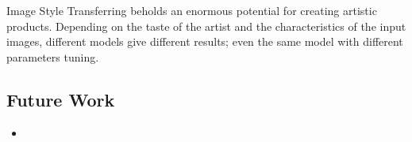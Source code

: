 Image Style Transferring beholds an enormous potential for creating artistic products.
Depending on the taste of the artist and the characteristics of the input images,
different models give different results; even the same model with different parameters tuning.

\subsection*{Future Work}
\begin{itemize}
    \item %
\end{itemize}
